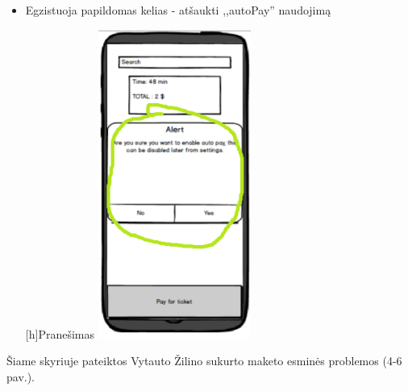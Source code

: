 \documentclass{VUMIFPSkursinis}
\begin{document}
\begin{itemize}
\begin{minipage}{\linewidth}
\end{minipage}
\item Egzistuoja papildomas kelias - atšaukti ,,autoPay'' naudojimą\par
\begin{minipage}{\linewidth}
[h]{Pranešimas}
\centering
\includegraphics[width=5cm]{img/Good3}
\end{minipage}
\end{itemize}

Šiame skyriuje pateiktos Vytauto Žilino sukurto maketo esminės problemos (4-6 pav.).
\end{document}
